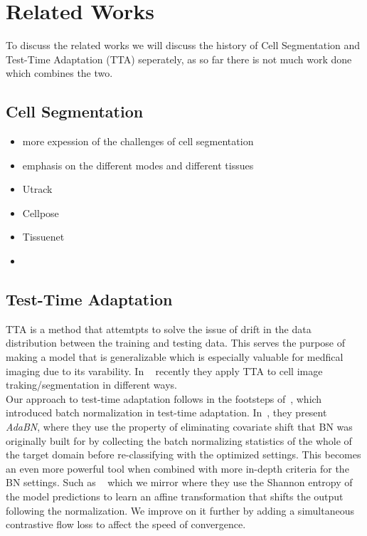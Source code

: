 \section{Related Works}
To discuss the related works we will discuss the history of Cell Segmentation and Test-Time Adaptation (TTA) seperately, as so far there is not much work done which combines the two.

\subsection{Cell Segmentation}
\begin{itemize}

    \item more expession of the challenges of cell segmentation 
    \item emphasis on the different modes and different tissues

    \item Utrack 
    \item Cellpose
    \item Tissuenet
    \item 
\end{itemize}

\subsection{Test-Time Adaptation}

TTA is a method that attemtpts to solve the issue of drift in the data distribution between the training and testing data. This serves the purpose of making a model that is generalizable which is especially valuable for medfical imaging due to its varability. 
In ~\cite{chen2024cmtt,Moshkov2020-uy} recently they apply TTA to cell image traking/segmentation in different ways.\\

Our approach to test-time adaptation follows in the footsteps of~\cite{Li2018-el}, which introduced batch normalization in test-time adaptation. In~\cite{Li2018-el}, they present \textit{AdaBN}, where they use the property of eliminating covariate shift that BN was originally built for by collecting the batch normalizing statistics of the whole of the target domain before re-classifying with the optimized settings.  This becomes an even more powerful tool when combined with more in-depth criteria for the BN settings.  Such as ~\cite{wang2020tent} which we mirror where they use the Shannon entropy of the model predictions to learn an affine transformation that shifts the output following the normalization.  We improve on it further by adding a simultaneous contrastive flow loss to affect the speed of convergence.\\




